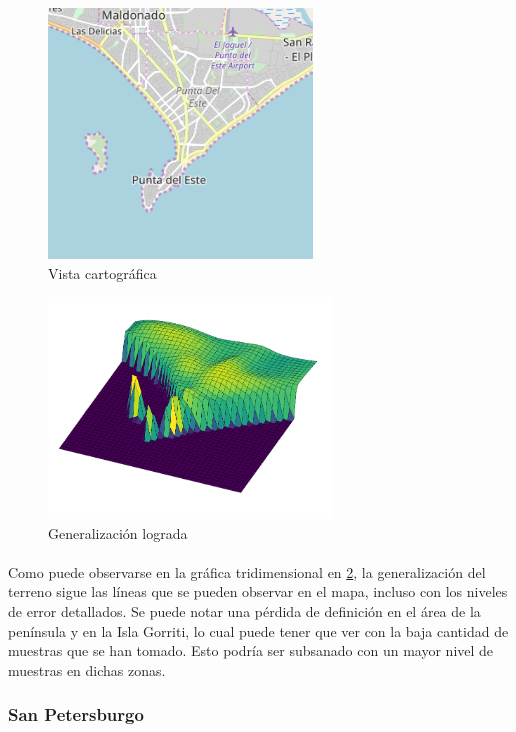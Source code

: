 \documentclass[12pt, twocolumn]{article}
\begin{document}
	\begin{figure}[H]
		\centering
		\includegraphics[width=7cm]{../results/other_terrains/punta/punta_map.png}
		\caption{Vista cartográfica}
		\label{puntamap}
	\end{figure}
	
	
	\begin{figure}[H]
		\centering
		\includegraphics[width=7.5cm]{../results/other_terrains/punta/punta_surf_10000.png}
		\caption{Generalización lograda}
		\label{punta}
	\end{figure}
	
	\paragraph{} Como puede observarse en la gráfica tridimensional en \ref{punta}, la generalización del terreno sigue las líneas que se pueden observar en el mapa, incluso con los niveles de error detallados. Se puede notar una pérdida de definición en el área de la península y en la Isla Gorriti, lo cual puede tener que ver con la baja cantidad de muestras que se han tomado. Esto podría ser subsanado con un mayor nivel de muestras en dichas zonas. 
	
	\subsubsection{San Petersburgo}
	
\end{document}

